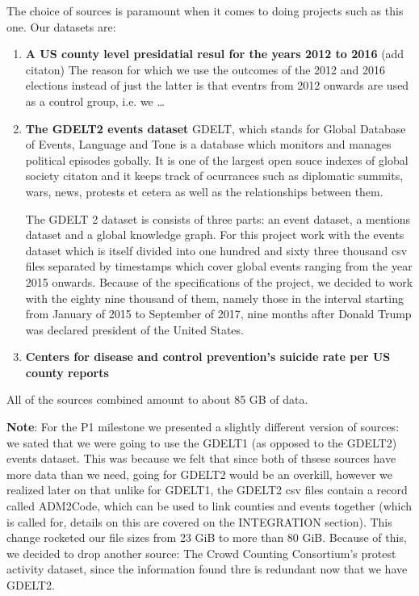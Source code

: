The choice of sources is paramount when it comes to doing projects
such as this one. Our datasets are:
\begin{enumerate}
	\item \textbf{A US county level presidatial resul for the
		years 2012 to 2016}
		{\color{red}(add citaton)}
		The reason for which we use the outcomes
		of the 2012 and 2016 elections instead of just the latter
		is that eventrs from 2012 onwards are used as a
		control group, i.e. we \ldots

	\item \textbf{The GDELT2 events dataset}
		GDELT, which stands for Global Database of Events, Language
		and Tone is a database which monitors and manages
		political episodes gobally. It is one of the largest
		open souce indexes of global society {\color{red} citaton}
		and it keeps track of ocurrances
		such as diplomatic summits, wars, news, protests et
		cetera as well as the relationships between them.


		The GDELT 2 dataset is consists of three parts: an
		event dataset, a mentions dataset and a global knowledge
		graph. For this project work with the events dataset
		which is itself divided into one hundred and sixty three
		thousand csv files separated by timestamps which cover
		global events ranging from the year 2015 onwards.
		Because of the specifications of the project, we decided
		to work with the eighty nine thousand of them, namely
		those in the interval starting from January of 2015 to
		September of 2017, nine months after Donald Trump
		was declared president of the United States.

	\item \textbf{Centers for disease and control prevention's
		suicide rate per US county reports}

\end{enumerate}
All of the sources combined amount to about 85 GB of data.

\textbf{Note}: For the P1 milestone we presented a slightly
different version of sources: we sated that we were going to use
the GDELT1 (as opposed to the GDELT2) events dataset.
This was because we felt that since both of thsese sources have
more data than we need, going for GDELT2 would be an overkill,
however we realized later on that unlike for GDELT1,
the GDELT2 csv files contain a record called ADM2Code,
which can be used to link counties and events together
(which is called for, details on this are covered
on the INTEGRATION section).
This change rocketed our file sizes from 23 GiB to more than
80 GiB. Because of this, we decided to drop another source:
The Crowd Counting Consortium's protest activity dataset, since
the information found thre is redundant now that we have
GDELT2.
